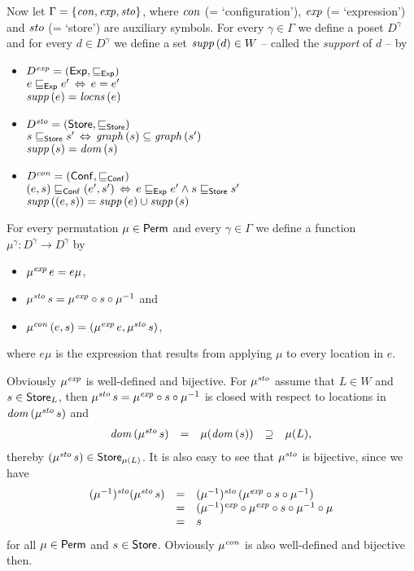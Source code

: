 \documentclass[12pt,a4paper]{report}
\newcommand{\Conf}{\sstyle{Conf}}
\newcommand{\scon}{\nstyle{con}}
\newcommand{\sexp}{\nstyle{exp}}
\newcommand{\ssto}{\nstyle{sto}}
\begin{document}
Now let $\Gamma = \{\scon,\sexp,\ssto\}$, where $\scon$ (= `configuration'),
$\sexp$ (= `expression') and $\ssto$ (= `store') are auxiliary symbols. For
every $\gamma \in \Gamma$ we define a poset $D^\gamma$ and for every $d \in D^\gamma$
we define a set $\mathit{supp}\,(d) \in W$ -- called the {\em support} of $d$ -- by
\begin{itemize}
  \item $D^\sexp = (\Exp,\sqsubseteq_\Exp)$ \\
        $e \sqsubseteq_{\mathsf{Exp}} e' \,\Leftrightarrow\, e = e'$ \\
        $\mathit{supp}\,(e) = \mathit{locns}\,(e)$
  \item $D^\ssto = (\Store,\sqsubseteq_\Store)$ \\
        $s \sqsubseteq_{\mathsf{Store}} s' \,\Leftrightarrow\, \mathit{graph}\,(s) \subseteq \mathit{graph}\,(s')$ \\
        $\mathit{supp}\,(s) = \mathit{dom}\,(s)$
  \item $D^\scon = (\Conf,\sqsubseteq_\Conf)$ \\
        $(e,s) \sqsubseteq_\Conf (e',s') \,\Leftrightarrow\, e \sqsubseteq_\Exp e' \wedge s \sqsubseteq_\Store s'$ \\
        $\mathit{supp}\,((e,s)) = \mathit{supp}\,(e) \cup \mathit{supp}\,(s)$
\end{itemize}
For every permutation $\mu \in \mathsf{Perm}$ and every $\gamma\in\Gamma$ we define
a function $\mu^\gamma:D^\gamma \to D^\gamma$ by
\begin{itemize}
  \item $\mu^\sexp\,e = e\mu$,
  \item $\mu^\ssto\,s = \mu^\sexp \circ s \circ \mu^{-1}$ and
  \item $\mu^\scon\,(e,s) = (\mu^\sexp\,e,\mu^\ssto\,s)$,
\end{itemize}
where $e\mu$ is the expression that results from applying $\mu$ to every location in $e$.

Obviously $\mu^\sexp$ is well-defined and bijective. For $\mu^\ssto$ assume that $L \in W$ and $s\in\mathsf{Store}_L$,
then $\mu^\ssto\,s = \mu^\sexp \circ s \circ \mu^{-1}$ is closed with respect to locations in
$\dom{\mu^\ssto\,s}$ and
\[\begin{array}{rccccl}
  \dom{\mu^\ssto\,s} &=& \mu(\dom{s}) &\supseteq& \mu(L),
\end{array}\]
thereby $(\mu^\ssto\,s) \in \Store_{\mu(L)}$. It is also easy to see that $\mu^\ssto$ is bijective, since
we have
\[\begin{array}{rcl}
  (\mu^{-1})^\ssto(\mu^\ssto\,s)
  &=& (\mu^{-1})^\ssto\,(\mu^\sexp \circ s \circ \mu^{-1}) \\
  &=& (\mu^{-1})^\sexp \circ \mu^\sexp \circ s \circ \mu^{-1} \circ \mu \\
  &=& s
\end{array}\]
for all $\mu\in\mathsf{Perm}$ and $s\in\mathsf{Store}$. Obviously $\mu^\scon$ is also well-defined and bijective then.
\end{document}
